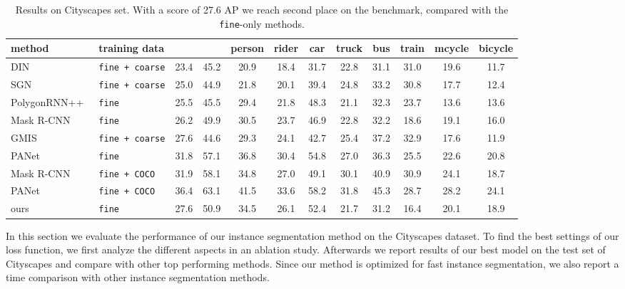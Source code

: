 \begin{table*}[ht!]
    \small
    \centering
    \begin{tabular}[t]{l|l|c c | c c c c c c c c}
         method & training data &  &  & person & rider & car & truck & bus & train & mcycle & bicycle \\
         \hline
         DIN~\cite{arnab2017pixelwise}          & \texttt{fine\,+\,coarse}  & 23.4 & 45.2 & 20.9 & 18.4 & 31.7 & 22.8 & 31.1 & 31.0 & 19.6 & 11.7 \\ 
         SGN~\cite{liu2017sgn}                  & \texttt{fine\,+\,coarse}  & 25.0 & 44.9 & 21.8 & 20.1 & 39.4 & 24.8 & 33.2 & 30.8 & 17.7 & 12.4 \\
         PolygonRNN++~\cite{acuna2018efficient} & \texttt{fine}             & 25.5 & 45.5 & 29.4 & 21.8 & 48.3 & 21.1 & 32.3 & 23.7 & 13.6 & 13.6 \\ 
         Mask R-CNN~\cite{he2017mask}           & \texttt{fine}             & 26.2 & 49.9 & 30.5 & 23.7 & 46.9 & 22.8 & 32.2 & 18.6 & 19.1 & 16.0 \\
         GMIS~\cite{liu2018affinity}            & \texttt{fine\,+\,coarse}  & 27.6 & 44.6 & 29.3 & 24.1 & 42.7 & 25.4 & 37.2 & 32.9 & 17.6 & 11.9 \\
         PANet~\cite{liu2018path}               & \texttt{fine}             & 31.8 & 57.1 & 36.8 & 30.4 & 54.8 & 27.0 & 36.3 & 25.5 & 22.6 & 20.8 \\
         Mask R-CNN~\cite{he2017mask}           & \texttt{fine\,+\,COCO}    & 31.9 & 58.1 & 34.8 & 27.0 & 49.1 & 30.1 & 40.9 & 30.9 & 24.1 & 18.7 \\   
         PANet~\cite{liu2018path}               & \texttt{fine\,+\,COCO}    & 36.4 & 63.1 & 41.5 & 33.6 & 58.2 & 31.8 & 45.3 & 28.7 & 28.2 & 24.1 \\
         \hline
         ours           & \texttt{fine}             & 27.6 & 50.9 & 34.5 & 26.1 & 52.4 & 21.7 & 31.2 & 16.4 & 20.1 & 18.9 \\
    \end{tabular}
    \vspace{3mm}
    \caption{Results on Cityscapes  set. With a score of 27.6 AP we reach second place on the benchmark, compared with the \texttt{fine}-only methods.}
    \label{tab:results_cityscapes}
\end{table*}


In this section we evaluate the performance of our instance segmentation method on the Cityscapes dataset. To find the best settings of our loss function, we first analyze the different aspects in an ablation study. Afterwards we report results of our best model on the test set of Cityscapes and compare with other top performing methods. Since our method is optimized for fast instance segmentation, we also report a time comparison with other instance segmentation methods.

